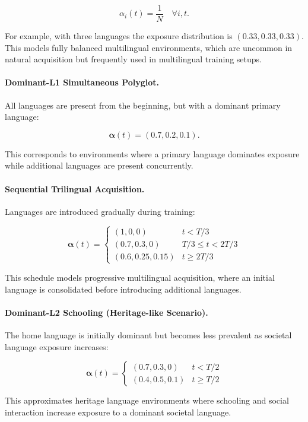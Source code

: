 \[
\alpha_i(t) = \frac{1}{N} \quad \forall i,t.
\]

For example, with three languages the exposure distribution is $(0.33, 0.33, 0.33)$. 
This models fully balanced multilingual environments, which are uncommon in natural acquisition but frequently used in multilingual training setups.

\paragraph{Dominant-L1 Simultaneous Polyglot.}
All languages are present from the beginning, but with a dominant primary language:

\[
\boldsymbol{\alpha}(t) = (0.7, 0.2, 0.1).
\]

This corresponds to environments where a primary language dominates exposure while additional languages are present concurrently.

\paragraph{Sequential Trilingual Acquisition.}
Languages are introduced gradually during training:

\[
\boldsymbol{\alpha}(t) =
\begin{cases}
(1,0,0) & t < T/3 \\
(0.7,0.3,0) & T/3 \le t < 2T/3 \\
(0.6,0.25,0.15) & t \ge 2T/3
\end{cases}
\]

This schedule models progressive multilingual acquisition, where an initial language is consolidated before introducing additional languages.

\paragraph{Dominant-L2 Schooling (Heritage-like Scenario).}
The home language is initially dominant but becomes less prevalent as societal language exposure increases:

\[
\boldsymbol{\alpha}(t) =
\begin{cases}
(0.7,0.3,0) & t < T/2 \\
(0.4,0.5,0.1) & t \ge T/2
\end{cases}
\]

This approximates heritage language environments where schooling and social interaction increase exposure to a dominant societal language.

